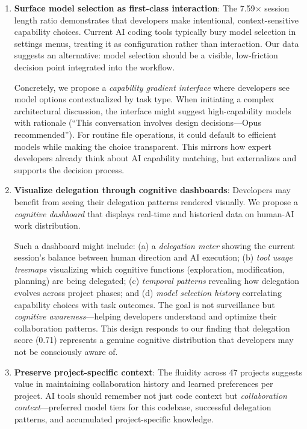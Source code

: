 \begin{enumerate}
    \item \textbf{Surface model selection as first-class interaction}: The 7.59$\times$ session length ratio demonstrates that developers make intentional, context-sensitive capability choices. Current AI coding tools typically bury model selection in settings menus, treating it as configuration rather than interaction. Our data suggests an alternative: model selection should be a visible, low-friction decision point integrated into the workflow.

    Concretely, we propose a \textit{capability gradient interface} where developers see model options contextualized by task type. When initiating a complex architectural discussion, the interface might suggest high-capability models with rationale (``This conversation involves design decisions---Opus recommended''). For routine file operations, it could default to efficient models while making the choice transparent. This mirrors how expert developers already think about AI capability matching, but externalizes and supports the decision process.

    \item \textbf{Visualize delegation through cognitive dashboards}: Developers may benefit from seeing their delegation patterns rendered visually. We propose a \textit{cognitive dashboard} that displays real-time and historical data on human-AI work distribution.

    Such a dashboard might include: (a) a \textit{delegation meter} showing the current session's balance between human direction and AI execution; (b) \textit{tool usage treemaps} visualizing which cognitive functions (exploration, modification, planning) are being delegated; (c) \textit{temporal patterns} revealing how delegation evolves across project phases; and (d) \textit{model selection history} correlating capability choices with task outcomes. The goal is not surveillance but \textit{cognitive awareness}---helping developers understand and optimize their collaboration patterns. This design responds to our finding that delegation score (0.71) represents a genuine cognitive distribution that developers may not be consciously aware of.

    \item \textbf{Preserve project-specific context}: The fluidity across 47 projects suggests value in maintaining collaboration history and learned preferences per project. AI tools should remember not just code context but \textit{collaboration context}---preferred model tiers for this codebase, successful delegation patterns, and accumulated project-specific knowledge.


\end{enumerate}
